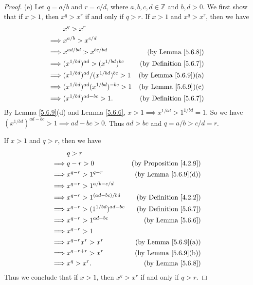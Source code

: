 \begin{proof}{(e)}
Let \(q = a / b\) and \(r = c / d\), where \(a, b, c, d \in \mathds{Z}\) and \(b, d > 0\).
We first show that if \(x > 1\), then \(x^q > x^r\) if and only if \(q > r\).
If \(x > 1\) and \(x^q > x^r\), then we have
\begin{align*}
& x^q > x^r \\
\implies & x^{a / b} > x^{c / d} \\
\implies & x^{ad / bd} > x^{bc / bd} & \text{(by Lemma \ref{5.6.8})} \\
\implies & (x^{1 / bd})^{ad} > (x^{1 / bd})^{bc} & \text{(by Definition \ref{5.6.7})} \\
\implies & (x^{1 / bd})^{ad} / (x^{1 / bd})^{bc} > 1 & \text{(by Lemma \ref{5.6.9})(a)} \\
\implies & (x^{1 / bd})^{ad} (x^{1 / bd})^{-bc} > 1 & \text{(by Lemma \ref{5.6.9})(c)} \\
\implies & (x^{1 / bd})^{ad - bc} > 1. & \text{(by Definition \ref{5.6.7})}
\end{align*}
By Lemma \ref{5.6.9}(d) and Lemma \ref{5.6.6}, \(x > 1 \implies x^{1 / bd} > 1^{1 / bd} = 1\).
So we have \((x^{1 / bd})^{ad - bc} > 1 \implies ad - bc > 0\).
Thus \(ad > bc\) and \(q = a / b > c / d = r\).

If \(x > 1\) and \(q > r\), then we have
\begin{align*}
& q > r \\
\implies & q - r > 0 & \text{(by Proposition \ref{4.2.9})} \\
\implies & x^{q - r} > 1^{q - r} & \text{(by Lemma \ref{5.6.9}(d))} \\
\implies & x^{q - r} > 1^{a / b - c / d} \\
\implies & x^{q - r} > 1^{(ad - bc) / bd} & \text{(by Definition \ref{4.2.2})} \\
\implies & x^{q - r} > (1^{1 / bd})^{ad - bc} & \text{(by Definition \ref{5.6.7})} \\
\implies & x^{q - r} > 1^{ad - bc} & \text{(by Lemma \ref{5.6.6})} \\
\implies & x^{q - r} > 1 \\
\implies & x^{q - r} x^r > x^r & \text{(by Lemma \ref{5.6.9}(a))} \\
\implies & x^{q - r + r} > x^r & \text{(by Lemma \ref{5.6.9}(b))} \\
\implies & x^q > x^r. & \text{(by Lemma \ref{5.6.8})}
\end{align*}
Thus we conclude that if \(x > 1\), then \(x^q > x^r\) if and only if \(q > r\).


\end{proof}
